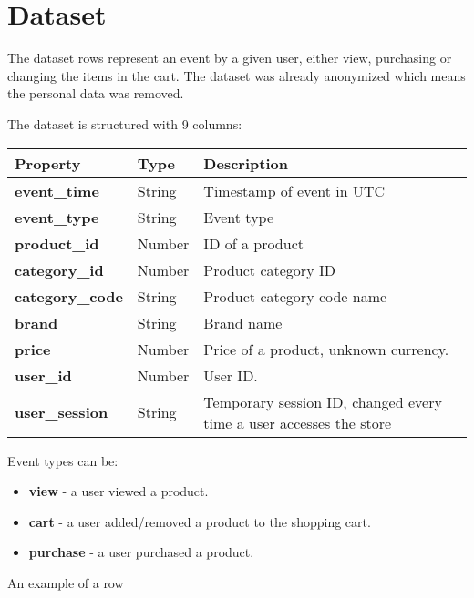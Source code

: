 \section{Dataset}
\label{dataset}

The dataset rows represent an event by a given user, either view, purchasing or changing the items in the cart.
The dataset was already anonymized which means the personal data was removed.

The dataset is structured with 9 columns:
\begin{center}
\begin{tabular}{ | p{3cm} | p{2cm} | p{7cm} | } 
 \hline
 \textbf{Property} & \textbf{Type} & \textbf{Description} \\  
 \hline
 \textbf{event\_time} & String & Timestamp of event in UTC \\
 \hline
 \textbf{event\_type} & String & Event type \\
 \hline
 \textbf{product\_id} & Number & ID of a product \\
 \hline
 \textbf{category\_id} & Number & Product category ID \\
 \hline
 \textbf{category\_code} & String & Product category code name \\
 \hline
 \textbf{brand} & String & Brand name \\
 \hline
 \textbf{price} & Number & Price of a product, unknown currency. \\
 \hline
 \textbf{user\_id} & Number & User ID. \\
 \hline
 \textbf{user\_session} & String & Temporary session ID, changed every time a user accesses the store \\
 \hline
\end{tabular}
\end{center}

Event types can be:
\begin{itemize}
    \item \textbf{view} - a user viewed a product.
    \item \textbf{cart} - a user added/removed a product to the shopping cart.
    \item \textbf{purchase} - a user purchased a product.
\end{itemize}

An example of a row

